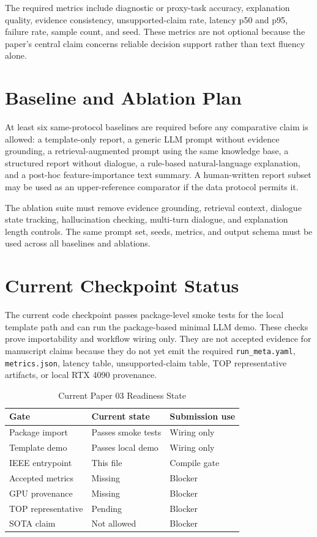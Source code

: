 \documentclass[journal]{IEEEtran}
\begin{document}
The required metrics include diagnostic or proxy-task accuracy, explanation
quality, evidence consistency, unsupported-claim rate, latency p50 and p95,
failure rate, sample count, and seed. These metrics are not optional because
the paper's central claim concerns reliable decision support rather than text
fluency alone.

\section{Baseline and Ablation Plan}
At least six same-protocol baselines are required before any comparative claim
is allowed: a template-only report, a generic LLM prompt without evidence
grounding, a retrieval-augmented prompt using the same knowledge base, a
structured report without dialogue, a rule-based natural-language explanation,
and a post-hoc feature-importance text summary. A human-written report subset
may be used as an upper-reference comparator if the data protocol permits it.

The ablation suite must remove evidence grounding, retrieval context, dialogue
state tracking, hallucination checking, multi-turn dialogue, and explanation
length controls. The same prompt set, seeds, metrics, and output schema must
be used across all baselines and ablations.

\section{Current Checkpoint Status}
The current code checkpoint passes package-level smoke tests for the local
template path and can run the package-based minimal LLM demo. These checks
prove importability and workflow wiring only. They are not accepted evidence
for manuscript claims because they do not yet emit the required
\texttt{run\_meta.yaml}, \texttt{metrics.json}, latency table, unsupported-claim
table, TOP representative artifacts, or local RTX 4090 provenance.

\begin{table}[!t]
\caption{Current Paper 03 Readiness State}
\label{tab:readiness}
\centering
\begin{tabular}{lll}
\toprule
Gate & Current state & Submission use \\
\midrule
Package import & Passes smoke tests & Wiring only \\
Template demo & Passes local demo & Wiring only \\
IEEE entrypoint & This file & Compile gate \\
Accepted metrics & Missing & Blocker \\
GPU provenance & Missing & Blocker \\
TOP representative & Pending & Blocker \\
SOTA claim & Not allowed & Blocker \\
\bottomrule
\end{tabular}
\end{table}
\end{document}
